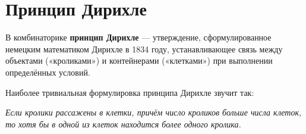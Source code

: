 \hypertarget{pigeonhole_principle}{\section{Принцип Дирихле}}
В комбинаторике \textbf{принцип Дирихле} — утверждение, сформулированное немецким математиком Дирихле в 1834 году, устанавливающее связь между объектами («кроликами») и контейнерами («клетками») при выполнении определённых условий. 

Наиболее тривиальная формулировка принципа Дирихле звучит так:
\begin{center}
\textit{Если кролики рассажены в клетки, причём число кроликов больше числа клеток, то хотя бы в одной из клеток находится более одного кролика.}
\end{center}